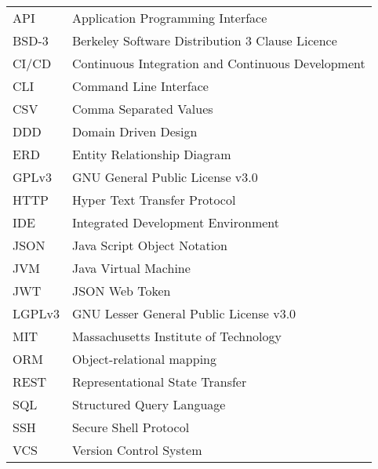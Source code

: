 \begin{longtable}{p{3cm}p{10cm}}
    API&Application Programming Interface\\
    BSD-3&Berkeley Software Distribution 3 Clause Licence\\
    CI/CD&Continuous Integration and Continuous Development\\
    CLI&Command Line Interface\\
    CSV&Comma Separated Values\\
    DDD&Domain Driven Design\\
    ERD&Entity Relationship Diagram\\
    GPLv3&GNU General Public License v3.0\\
    HTTP&Hyper Text Transfer Protocol\\
    IDE&Integrated Development Environment\\
    JSON&Java Script Object Notation\\
    JVM&Java Virtual Machine\\
    JWT&JSON Web Token\\
    LGPLv3&GNU Lesser General Public License v3.0\\
    MIT&Massachusetts Institute of Technology\\
    ORM&Object-relational mapping\\
    REST&Representational State Transfer\\
    SQL&Structured Query Language\\
    SSH&Secure Shell Protocol\\
    VCS&Version Control System\\
\end{longtable}
\addtocounter{table}{-1}
